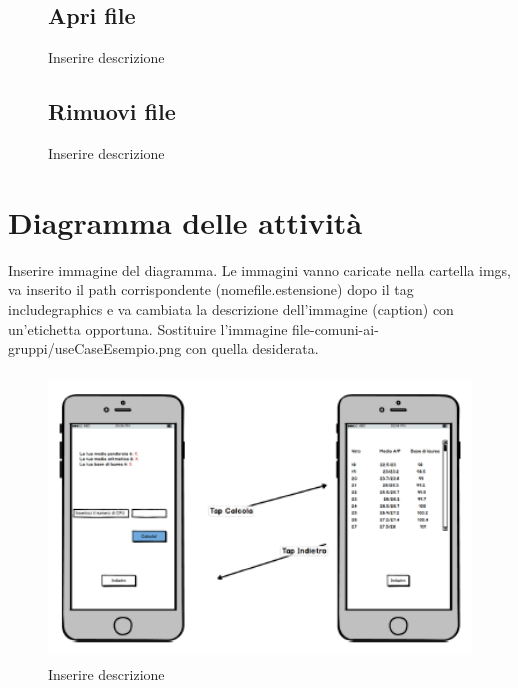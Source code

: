 
\begin{figure}
	\subsection{Apri file}
	\centering
	\caption{Inserire descrizione}
	\label{fig:prova}
\end{figure}


\begin{figure}
	\subsection{Rimuovi file}
	\centering
	\caption{Inserire descrizione}
	\label{fig:prova}
\end{figure}



\section{Diagramma delle attività}

Inserire immagine del diagramma. Le immagini vanno caricate nella cartella imgs, va inserito il path corrispondente (nomefile.estensione) dopo il tag includegraphics e va cambiata la descrizione dell'immagine (caption) con un'etichetta opportuna. Sostituire l'immagine file-comuni-ai-gruppi/useCaseEsempio.png con quella desiderata.

\begin{figure}
	\centering
	\includegraphics[height=3in,width=5in]{imgs/file-comuni-ai-gruppi/ActivityDgEsempio.png}
	\caption{Inserire descrizione}
	\label{fig:prova}
\end{figure}

\clearpage

